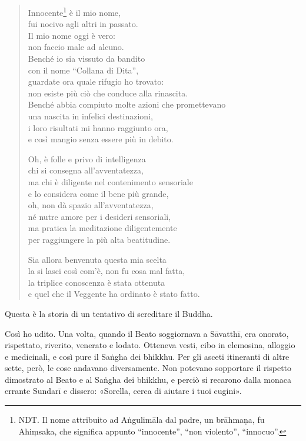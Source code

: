 \begin{quote}
Innocente\footnote{NDT. Il nome attribuito ad Aṅgulimāla dal padre, un brāhmaṇa, fu Ahiṃsaka, che significa appunto “innocente”, “non violento”, “innocuo”.} è il mio nome, \\
fui nocivo agli altri in passato. \\
Il mio nome oggi è vero: \\
non faccio male ad alcuno. \\
Benché io sia vissuto da bandito \\
con il nome “Collana di Dita”, \\
guardate ora quale rifugio ho trovato: \\
non esiste più ciò che conduce alla rinascita. \\
Benché abbia compiuto molte azioni che promettevano \\
una nascita in infelici destinazioni, \\
i loro risultati mi hanno raggiunto ora, \\
e così mangio senza essere più in debito.


Oh, è folle e privo di intelligenza \\
chi si consegna all’avventatezza, \\
ma chi è diligente nel contenimento sensoriale \\
e lo considera come il bene più grande, \\
oh, non dà spazio all’avventatezza, \\
né nutre amore per i desideri sensoriali, \\
ma pratica la meditazione diligentemente \\
per raggiungere la più alta beatitudine.


Sia allora benvenuta questa mia scelta \\
la si lasci così com’è, non fu cosa mal fatta, \\
la triplice conoscenza è stata ottenuta \\
e quel che il Veggente ha ordinato è stato fatto.
\end{quote}



 Questa è la storia di un tentativo di screditare il
Buddha.


 Così ho udito. Una volta, quando il Beato soggiornava a
Sāvatthī, era onorato, rispettato, riverito, venerato e lodato. Otteneva
vesti, cibo in elemosina, alloggio e medicinali, e così pure il Saṅgha
dei bhikkhu. Per gli asceti itineranti di altre sette, però, le cose
andavano diversamente. Non potevano sopportare il rispetto dimostrato al
Beato e al Saṅgha dei bhikkhu, e perciò si recarono dalla monaca errante
Sundarī e dissero: «Sorella, cerca di aiutare i tuoi cugini».


